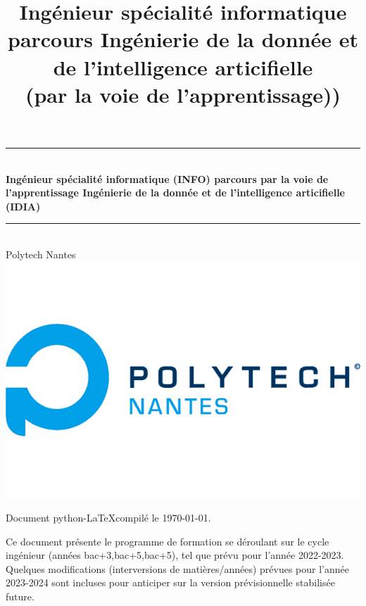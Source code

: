 \documentclass[a4paper, 11pt]{article}
\title{Ingénieur spécialité informatique \\ parcours Ingénierie de la donnée et de l'intelligence articifielle \\ (par la voie de l'apprentissage))}
\date{}
\begin{document}
\begin{titlepage}
    \begin{centering}
    \newcommand{\HRule}{\rule{\linewidth}{0.5mm}}

    \HRule \\[0.4cm]
    { \huge \bfseries Ingénieur spécialité informatique (INFO)\linebreak 
    \vspace*{1cm} \huge parcours 
    \linebreak par la voie de l'apprentissage \vspace*{1cm} \linebreak
     Ingénierie de la donnée 
     \linebreak et de l'intelligence articifielle (IDIA) 
     \linebreak \vspace*{1cm} \\[0.15cm] }
    \HRule \\[1.5cm]
    \Huge Polytech Nantes
    \\[1cm]
    \includegraphics[scale=0.4]{polytech-nantes.png}
    \end{centering}

\vfill

Document python-\LaTeX \quad compilé le \today.
\end{titlepage}

\vfill

Ce document présente le programme de formation se déroulant sur le cycle ingénieur (années bac+3,bac+5,bac+5), tel que prévu pour l'année 2022-2023. Quelques modifications (interversions de matières/années) prévues pour l'année 2023-2024 sont incluses pour anticiper sur la version prévisionnelle stabilisée future.
\end{document}
